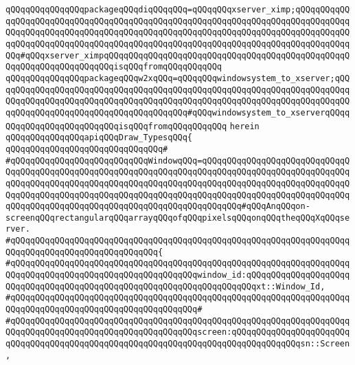 \verb|qQQqqQQqqQQqqQQqpackageqQQqdiqQQqqQQq=qQQqqQQqxserver_ximp;qQQqqQQqqQQqqQQqqQQqqQQqqQQqqQQqqQQqqQQqqQQqqQQqqQQqqQQqqQQqqQQqqQQqqQQqqQQqqQQqqQQqqQQqqQQqqQQqqQQqqQQqqQQqqQQqqQQqqQQqqQQqqQQqqQQqqQQqqQQqqQQqqQQqqQQqqQQqqQQqqQQqqQQqqQQqqQQqqQQqqQQqqQQqqQQqqQQqqQQqqQQqqQQqqQQqqQQqqQQqqQQq#qQQqxserver_ximpqQQqqQQqqQQqqQQqqQQqqQQqqQQqqQQqqQQqqQQqqQQqqQQqqQQqqQQqqQQqqQQqqQQqqQQqisqQQqfromqQQqqQQqqQQq|\newline
\verb|qQQqqQQqqQQqqQQqpackageqQQqw2xqQQq=qQQqqQQqwindowsystem_to_xserver;qQQqqQQqqQQqqQQqqQQqqQQqqQQqqQQqqQQqqQQqqQQqqQQqqQQqqQQqqQQqqQQqqQQqqQQqqQQqqQQqqQQqqQQqqQQqqQQqqQQqqQQqqQQqqQQqqQQqqQQqqQQqqQQqqQQqqQQqqQQqqQQqqQQqqQQqqQQqqQQqqQQqqQQqqQQqqQQqqQQq#qQQqwindowsystem_to_xserverqQQqqQQqqQQqqQQqqQQqqQQqqQQqisqQQqfromqQQqqQQqqQQq|\newline
\verb|herein|\newline
\newline
\verb|qQQqqQQqqQQqqQQqapiqQQqDraw_TypesqQQq{|\newline
\verb|qQQqqQQqqQQqqQQqqQQqqQQqqQQqqQQq#|\newline
\verb|#qQQqqQQqqQQqqQQqqQQqqQQqqQQqWindowqQQq=qQQqqQQqqQQqqQQqqQQqqQQqqQQqqQQqqQQqqQQqqQQqqQQqqQQqqQQqqQQqqQQqqQQqqQQqqQQqqQQqqQQqqQQqqQQqqQQqqQQqqQQqqQQqqQQqqQQqqQQqqQQqqQQqqQQqqQQqqQQqqQQqqQQqqQQqqQQqqQQqqQQqqQQqqQQqqQQqqQQqqQQqqQQqqQQqqQQqqQQqqQQqqQQqqQQqqQQqqQQqqQQqqQQqqQQqqQQqqQQqqQQqqQQqqQQqqQQqqQQqqQQqqQQqqQQqqQQqqQQqqQQqqQQq#qQQqAnqQQqon-screenqQQqrectangularqQQqarrayqQQqofqQQqpixelsqQQqonqQQqtheqQQqXqQQqserver.|\newline
\verb|#qQQqqQQqqQQqqQQqqQQqqQQqqQQqqQQqqQQqqQQqqQQqqQQqqQQqqQQqqQQqqQQqqQQqqQQqqQQqqQQqqQQqqQQqqQQqqQQqqQQq{|\newline
\verb|#qQQqqQQqqQQqqQQqqQQqqQQqqQQqqQQqqQQqqQQqqQQqqQQqqQQqqQQqqQQqqQQqqQQqqQQqqQQqqQQqqQQqqQQqqQQqqQQqqQQqqQQqqQQqwindow_id:qQQqqQQqqQQqqQQqqQQqqQQqqQQqqQQqqQQqqQQqqQQqqQQqqQQqqQQqqQQqqQQqqQQqqQQqxt::Window_Id,|\newline
\verb|#qQQqqQQqqQQqqQQqqQQqqQQqqQQqqQQqqQQqqQQqqQQqqQQqqQQqqQQqqQQqqQQqqQQqqQQqqQQqqQQqqQQqqQQqqQQqqQQqqQQqqQQqqQQq#|\newline
\verb|#qQQqqQQqqQQqqQQqqQQqqQQqqQQqqQQqqQQqqQQqqQQqqQQqqQQqqQQqqQQqqQQqqQQqqQQqqQQqqQQqqQQqqQQqqQQqqQQqqQQqqQQqqQQqscreen:qQQqqQQqqQQqqQQqqQQqqQQqqQQqqQQqqQQqqQQqqQQqqQQqqQQqqQQqqQQqqQQqqQQqqQQqqQQqqQQqqQQqsn::Screen,|\newline
